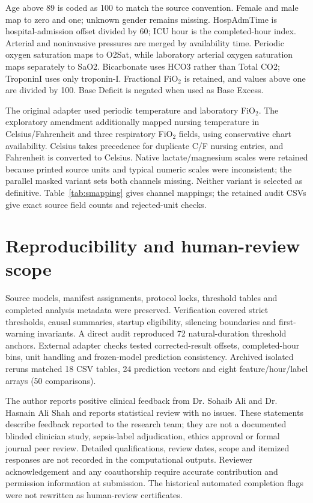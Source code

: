\documentclass[11pt,a4paper]{article}
\begin{document}
Age above 89 is coded as 100 to match the source convention. Female and male map to zero and one; unknown gender remains missing. HospAdmTime is hospital-admission offset divided by 60; ICU hour is the completed-hour index. Arterial and noninvasive pressures are merged by availability time. Periodic oxygen saturation maps to O2Sat, while laboratory arterial oxygen saturation maps separately to SaO2. Bicarbonate uses HCO3 rather than Total CO2; TroponinI uses only troponin-I. Fractional FiO$_2$ is retained, and values above one are divided by 100. Base Deficit is negated when used as Base Excess.

The original adapter used periodic temperature and laboratory FiO$_2$. The exploratory amendment additionally mapped nursing temperature in Celsius/Fahrenheit and three respiratory FiO$_2$ fields, using conservative chart availability. Celsius takes precedence for duplicate C/F nursing entries, and Fahrenheit is converted to Celsius. Native lactate/magnesium scales were retained because printed source units and typical numeric scales were inconsistent; the parallel masked variant sets both channels missing. Neither variant is selected as definitive. Table~\ref{tab:smapping} gives channel mappings; the retained audit CSVs give exact source field counts and rejected-unit checks.


\FloatBarrier

\section{Reproducibility and human-review scope}
Source models, manifest assignments, protocol locks, threshold tables and completed analysis metadata were preserved. Verification covered strict thresholds, causal summaries, startup eligibility, silencing boundaries and first-warning invariants. A direct audit reproduced 72 natural-duration threshold anchors. External adapter checks tested corrected-result offsets, completed-hour bins, unit handling and frozen-model prediction consistency. Archived isolated reruns matched 18 CSV tables, 24 prediction vectors and eight feature/hour/label arrays (50 comparisons).

The author reports positive clinical feedback from Dr. Sohaib Ali and Dr. Hasnain Ali Shah and reports statistical review with no issues. These statements describe feedback reported to the research team; they are not a documented blinded clinician study, sepsis-label adjudication, ethics approval or formal journal peer review. Detailed qualifications, review dates, scope and itemized responses are not recorded in the computational outputs. Reviewer acknowledgement and any coauthorship require accurate contribution and permission information at submission. The historical automated completion flags were not rewritten as human-review certificates.
\end{document}
